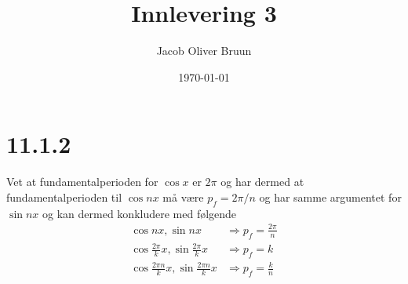 \documentclass{report}
\title{Innlevering 3}
\author{Jacob Oliver Bruun}
\date{\today}
\begin{document}
\section*{11.1.2}
Vet at fundamentalperioden for $\cos x$ er $2\pi$ og har dermed at fundamentalperioden til $\cos nx$ må være $p_{f} = 2\pi /n$ og har samme argumentet for $\sin nx$ og kan dermed konkludere med følgende
\begin{equation}
  \label{eq:1}
  \begin{split}
    \cos nx, \sin nx &\Rightarrow p_{f} = \frac{2\pi}{n} \\
    \cos \frac{2\pi}{k} x, \sin \frac{2\pi}{k} x &\Rightarrow p_{f} = k \\
    \cos \frac{2\pi n}{k} x, \sin \frac{2\pi n}{k} x &\Rightarrow p_{f} = \frac{k}{n} \\
  \end{split}
\end{equation}
\end{document}
